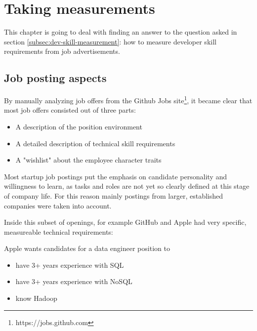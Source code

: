 \chapter{Taking measurements}
This chapter is going to deal with finding an answer
to the question asked in section \ref{subsec:dev-skill-measurement}:
how to measure developer skill requirements from job advertisements.

%

\section{Job posting aspects}
By manually analyzing job offers from the Github Jobs
site\footnote{https://jobs.github.com}, it became clear that most
job offers consisted out of three parts:

\begin{itemize}
\item A description of the position environment
\item A detailed description of technical skill requirements
\item A "wishlist" about the employee character traits
\end{itemize}

Most startup job postings put the emphasis on candidate personality and
willingness to learn, as tasks and roles are not yet so clearly defined
at this stage of company life. For this reason mainly postings from larger,
established companies were taken into account.
\newline

Inside this subset of openings, for example GitHub and Apple had very
specific, measureable technical requirements:
\newline

Apple wants candidates for a data engineer position to
\begin{itemize}
    \item have 3+ years experience with SQL
    \item have 3+ years experience with NoSQL
    \item know Hadoop
\end{itemize}

